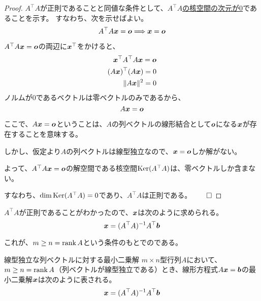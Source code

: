 \documentclass[../../../topic_linear-algebra]{subfiles}
\begin{document}
\begin{proof}
  $A^\top A$が正則であることと同値な条件として、\hyperref[thm:invertibility-by-kernel]{$A^\top A$の核空間の次元が0}であることを示す。
  すなわち、次を示せばよい。
  \begin{equation*}
    A^\top A \vb*{x} = \vb*{o} \Longrightarrow \vb*{x} = \vb*{o}
  \end{equation*}
  
  $A^\top A \vb*{x} = \vb*{o}$の両辺に$\vb*{x}^\top$をかけると、
  \begin{align*}
    \vb*{x}^\top A^\top A \vb*{x} = \vb*{o} \\
    (A \vb*{x})^\top (A \vb*{x}) = 0 \\
    \| A \vb*{x} \|^2 = 0
  \end{align*}
  ノルムが0であるベクトルは零ベクトルのみであるから、
  \begin{equation*}
    A \vb*{x} = \vb*{o}
  \end{equation*}
  
  ここで、$A \vb*{x} = \vb*{o}$ということは、$A$の列ベクトルの線形結合として$\vb*{o}$になる$\vb*{x}$が存在することを意味する。
  
  しかし、仮定より$A$の列ベクトルは線型独立なので、$\vb*{x} = \vb*{o}$しか解がない。
  
  \br
  
  よって、$A^\top A \vb*{x} = \vb*{o}$の解空間である核空間$\operatorname{Ker}(A^\top A)$は、零ベクトルしか含まない。

  すなわち、$\dim \operatorname{Ker}(A^\top A) = 0$であり、$A^\top A$は正則である。$\qed$
\end{proof}

\br

$A^\top A$が正則であることがわかったので、$\vb*{x}$は次のように求められる。
\begin{equation*}
  \vb*{x} = (A^\top A)^{-1}A^\top \vb*{b}
\end{equation*}

これが、$m \geq n = \rank A$という条件のもとでのである。

\begin{theorem*}{線型独立な列ベクトルに対する最小二乗解}
  $m \times n$型行列$A$において、$m \geq n = \rank A$（列ベクトルが線型独立である）とき、線形方程式$A\vb*{x} = \vb*{b}$の最小二乗解$\vb*{x}$は次のように表される。
  \begin{equation*}
    \vb*{x} = (A^\top A)^{-1}A^\top \vb*{b}
  \end{equation*}
\end{theorem*}
\end{document}
